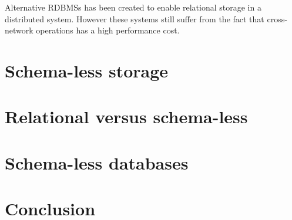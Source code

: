 Alternative RDBMSs has been created to enable relational storage in a distributed system\cite{Cattell:ScalableSQLAndNoSQLDataStores}.
However these systems still suffer from the fact that cross-network operations has a high performance cost.

\section{Schema-less storage}

\section{Relational versus schema-less}

\section{Schema-less databases}

\section{Conclusion}